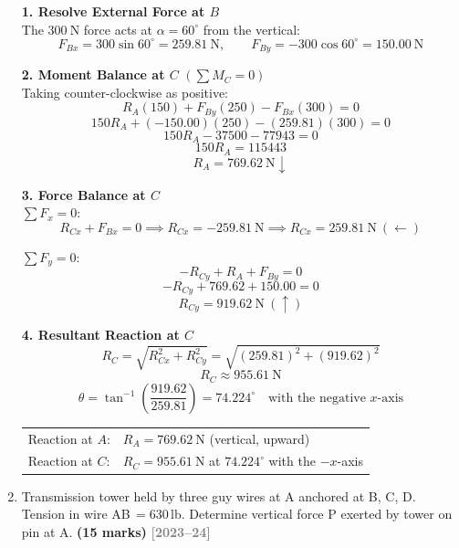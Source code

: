 \documentclass[12pt,a3paper]{article}
\newcommand{\yr}[1]{\hfill\textcolor{gray}{\small\textbf{[#1]}}}
\newcommand{\mk}[1]{\textcolor{orange!70!black}{\small\textbf{(#1 marks)}}}
\begin{document}
\begin{enumerate}
\begin{tcolorbox}[enhanced,breakable,ansbox,colback=cD!4,colframe=cD,
  boxrule=0.8pt,arc=5pt,
  title={\textbf{Solution}},fonttitle=\bfseries\color{white},
  colbacktitle=cD]

\textbf{1. Resolve External Force at $B$}\\[4pt]
The $300\ \text{N}$ force acts at $\alpha = 60^\circ$ from the vertical:
\[
  F_{Bx} = 300\sin60^\circ = 259.81\ \text{N}, \qquad
  F_{By} = -300\cos60^\circ = 150.00\ \text{N}
\]

\medskip
\textbf{2. Moment Balance at $C$} $\left(\sum M_C = 0\right)$\\[4pt]
Taking counter-clockwise as positive:
\[
  R_A(150) + F_{By}(250) - F_{Bx}(300) = 0
\]
\[
  150R_A + (-150.00)(250) - (259.81)(300) = 0
\]
\[
  150R_A - 37500 - 77943 = 0
\]
\[
  150R_A = 115443
\]
\[
  \boxed{R_A = 769.62\ \text{N} \downarrow}
\]

\medskip
\textbf{3. Force Balance at $C$}\\[4pt]

$\sum F_x = 0$:
\[
  R_{Cx} + F_{Bx} = 0 \implies R_{Cx} = -259.81\ \text{N} \implies R_{Cx} = 259.81\ \text{N}\ (\leftarrow)
\]

$\sum F_y = 0$:
\[
  -R_{Cy} + R_A + F_{By} = 0
\]
\[
  -R_{Cy} + 769.62 + 150.00 = 0
\]
\[
  R_{Cy} = 919.62\ \text{N}\ (\uparrow)
\]

\medskip
\textbf{4. Resultant Reaction at $C$}\\[4pt]
\[
  R_C = \sqrt{R_{Cx}^2 + R_{Cy}^2}
      = \sqrt{(259.81)^2 + (919.62)^2}
\]
\[
  \boxed{R_C \approx 955.61\ \text{N}}
\]
\[
  \theta = \tan^{-1}\!\left(\frac{919.62}{259.81}\right) = 74.224^\circ
  \quad \text{with the negative } x\text{-axis}
\]

\medskip
\begin{center}
\begin{tabular}{ll}
  Reaction at $A$: & $R_A = 769.62\ \text{N}$ (vertical, upward) \\[4pt]
  Reaction at $C$: & $R_C = 955.61\ \text{N}$ at $74.224^\circ$ with the $-x$-axis
\end{tabular}
\end{center}

\end{tcolorbox}

\item \label{qlabel:B1-Q48}
Transmission tower held by three guy wires at A anchored at B, C, D. Tension in wire AB\,$= 630$\,lb. Determine vertical force P exerted by tower on pin at A. \mk{15}
\yr{2023--24}



\end{enumerate}
\end{document}
